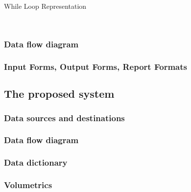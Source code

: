 \begin{algorithm}[H]
\label{fig:repeat_as_while_pseudo_example_2}
    \caption{While Loop Representation}
\begin{algorithmic}[1]
\State
{}
    
    	\SET
    \Else
    	\
    \EndIf
\EndWhile
\end{algorithmic}
\end{algorithm}
%

\subsubsection{Data flow diagram}

\subsubsection{Input Forms, Output Forms, Report Formats}

\subsection{The proposed system}

\subsubsection{Data sources and destinations}

\subsubsection{Data flow diagram}
\subsubsection{Data dictionary}
\subsubsection{Volumetrics}

